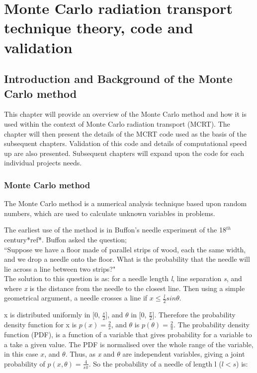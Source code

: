 \chapter{Monte Carlo radiation transport technique theory, code and validation}

\section{Introduction and Background of the Monte Carlo method}
This chapter will provide an overview of the Monte Carlo method and how it is used within the context of Monte Carlo radiation transport (MCRT). The chapter will then present the details of the MCRT code used as the basis of the subsequent chapters. Validation of this code and details of computational speed up are also presented. Subsequent chapters will expand upon the code for each individual projects needs.\\


\subsection{Monte Carlo method}
The Monte Carlo method is a numerical analysis technique based upon random numbers, which are used to calculate unknown variables in problems. 

The earliest use of the method is in Buffon's needle experiment of the 18$^{th}$ century*ref*. Buffon asked the question; \\


``Suppose we have a floor made of parallel strips of wood, each the same width, and we drop a needle onto the floor. What is the probability that the needle will lie across a line between two strips?"
\\

The solution to this question is as:
for a needle length \textit{l}, line separation \textit{s}, and where \textit{x} is the distance from the needle to the closest line. Then using a simple geometrical argument, a needle crosses a line if $x \leq \tfrac{l}{2} sin \theta$.

x is distributed uniformly in [0, $\tfrac{s}{2}$], and $\theta$ in [0, $\tfrac{\pi}{2}$]. Therefore the probability density function for x is $p(x)=\tfrac{2}{s}$, and $\theta$ is $p(\theta) = \tfrac{2}{\pi}$. The probability density function (PDF), is a function of a variable that gives probability for a variable to a take a given value. The PDF is normalised over the whole range of the variable, in this case $x$, and $\theta$.
Thus, as \textit{x} and $\theta$ are independent variables, giving a joint probability of $p(x,\theta) = \tfrac{4}{s \pi}$.
So the probability of a needle of length l ($l<s$) is:

